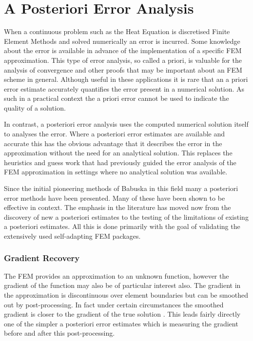 \documentclass{uonmathreport}
\theoremstyle{definition}
\theoremstyle{problem}
\theoremstyle{theorem}
\begin{document}
\newpage

\section{A Posteriori Error Analysis} \label{sec:Errors}

When a continuous problem such as the Heat Equation is discretised Finite Element Methods and solved numerically an error is incurred. Some knowledge about the error is available in advance of the implementation of a specific FEM approximation. This type of error analysis, so called a priori, is valuable for the analysis of convergence and other proofs that may be important about an FEM scheme in general. Although useful in these applications it is rare that an a priori error estimate accurately quantifies the error present in a numerical solution. As such in a practical context the a priori error cannot be used to indicate the quality of a solution. 

In contrast, a posteriori error analysis uses the computed numerical solution itself to analyses the error. Where a posteriori error estimates are available and accurate this has the obvious advantage that it describes the error in the approximation without the need for an analytical solution. This replaces the heuristics and guess work that had previously guided the error analysis of the FEM approximation in settings where no analytical solution was available. 

Since the initial pioneering methods of Babuska \cite{babuska1978posteriori} \cite{babuska1981posteriori} in this field many a posteriori error methods have been presented. Many of these have been shown to be effective in context. The emphasis in the literature has moved now from the discovery of new a posteriori estimates to the testing of the limitations of existing a posteriori estimates. All this is done primarily with the goal of validating the extensively used self-adapting FEM packages.

\subsubsection{Gradient Recovery} \label{subsubsec:KK}

The FEM provides an approximation to an unknown function, however the gradient of the function may also be of particular interest also. The gradient in the approximation is discontinuous over element boundaries but can be smoothed out by post-processing. In fact under certain circumstances the smoothed gradient is closer to the gradient of the true solution \cite{ainsworth65001posteriori}. This leads fairly directly one of the simpler a posteriori error estimates which is measuring the gradient before and after this post-processing.
\end{document}
